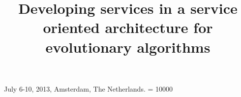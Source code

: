 \documentclass{sig-alternate}
\begin{document}
%
 {July 6-10, 2013, Amsterdam, The Netherlands.}
    \widowpenalty = 10000

\title{Developing services in a service oriented architecture for evolutionary algorithms}

%
%
%
%
%


 
\end{document}
